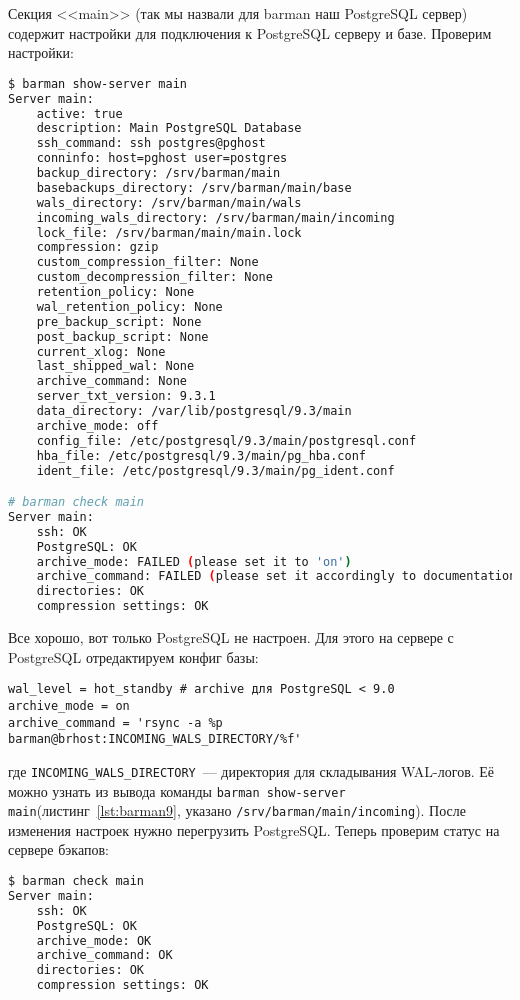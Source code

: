 Секция <<main>> (так мы назвали для barman наш PostgreSQL сервер) содержит настройки для подключения к PostgreSQL серверу и базе. Проверим настройки:

\begin{lstlisting}[language=Bash,label=lst:barman9,caption=Проверка barman настроек]
$ barman show-server main
Server main:
	active: true
	description: Main PostgreSQL Database
	ssh_command: ssh postgres@pghost
	conninfo: host=pghost user=postgres
	backup_directory: /srv/barman/main
	basebackups_directory: /srv/barman/main/base
	wals_directory: /srv/barman/main/wals
	incoming_wals_directory: /srv/barman/main/incoming
	lock_file: /srv/barman/main/main.lock
	compression: gzip
	custom_compression_filter: None
	custom_decompression_filter: None
	retention_policy: None
	wal_retention_policy: None
	pre_backup_script: None
	post_backup_script: None
	current_xlog: None
	last_shipped_wal: None
	archive_command: None
	server_txt_version: 9.3.1
	data_directory: /var/lib/postgresql/9.3/main
	archive_mode: off
	config_file: /etc/postgresql/9.3/main/postgresql.conf
	hba_file: /etc/postgresql/9.3/main/pg_hba.conf
	ident_file: /etc/postgresql/9.3/main/pg_ident.conf

# barman check main
Server main:
	ssh: OK
	PostgreSQL: OK
	archive_mode: FAILED (please set it to 'on')
	archive_command: FAILED (please set it accordingly to documentation)
	directories: OK
	compression settings: OK
\end{lstlisting}

Все хорошо, вот только PostgreSQL не настроен. Для этого на сервере с PostgreSQL отредактируем конфиг базы:

\begin{lstlisting}[label=lst:barman10,caption=Настройка PostgreSQL]
wal_level = hot_standby # archive для PostgreSQL < 9.0
archive_mode = on
archive_command = 'rsync -a %p barman@brhost:INCOMING_WALS_DIRECTORY/%f'
\end{lstlisting}

где \lstinline!INCOMING_WALS_DIRECTORY!~--- директория для складывания WAL-логов. Её можно узнать из вывода команды \lstinline!barman show-server main!(листинг~\ref{lst:barman9}, указано \lstinline!/srv/barman/main/incoming!). После изменения настроек нужно перегрузить PostgreSQL. Теперь проверим статус на сервере бэкапов:

\begin{lstlisting}[language=Bash,label=lst:barman11,caption=Проверка]
$ barman check main
Server main:
	ssh: OK
	PostgreSQL: OK
	archive_mode: OK
	archive_command: OK
	directories: OK
	compression settings: OK
\end{lstlisting}

